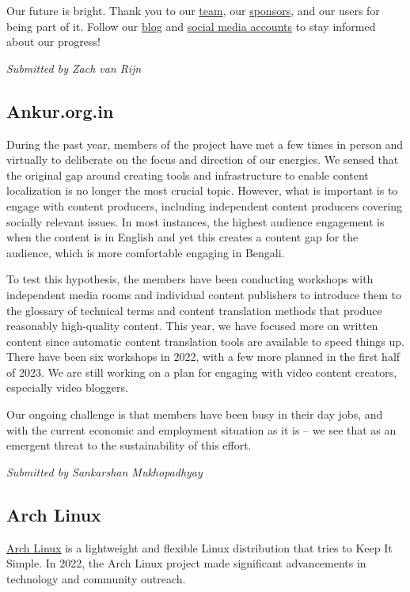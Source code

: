 \documentclass[a4paper]{report}
\begin{document}
Our future is bright. Thank you to our \href{https://git.adelielinux.org/groups/adelie/-/group_members}{team}, our \href{https://www.adelielinux.org/sponsors/}{sponsors}, and our users for being part of it. Follow our \href{https://blog.adelielinux.org/}{blog} and \href{https://www.adelielinux.org/contact/}{social media accounts} to stay informed about our progress!

{\em Submitted by Zach van Rijn}

\subsection{Ankur.org.in}

During the past year, members of the project have met a few times in person and virtually to deliberate on the focus and direction of our energies. We sensed that the original gap around creating tools and infrastructure to enable content localization is no longer the most crucial topic. However, what is important is to engage with content producers, including independent content producers covering socially relevant issues. In most instances, the highest audience engagement is when the content is in English and yet this creates a content gap for the audience, which is more comfortable engaging in Bengali.

To test this hypothesis, the members have been conducting workshops
with independent media rooms and individual content publishers to introduce them to the glossary of technical terms and content translation methods that produce reasonably high-quality content. This year, we have focused more on written content since automatic content translation tools are available to speed things up. There have been six workshops in 2022, with a few more planned in the first half of 2023. We are still working on a plan for engaging with video content creators, especially video bloggers.

Our ongoing challenge is that members have been busy in their day jobs, and with the current economic and employment situation as it is -- we see that as an emergent threat to the sustainability of this effort.

{\em Submitted by Sankarshan Mukhopadhyay}

\subsection{Arch Linux}

\href{https://archlinux.org/}{Arch Linux} is a lightweight and flexible Linux distribution that tries to Keep It Simple. In 2022, the Arch Linux project made significant advancements in technology and community outreach.
\end{document}
